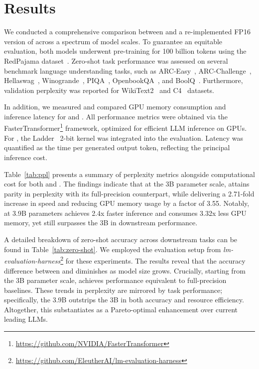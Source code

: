 \section{Results}

We conducted a comprehensive comparison between  and a re-implemented FP16 version of  across a spectrum of model scales. To guarantee an equitable evaluation, both models underwent pre-training for 100 billion tokens using the RedPajama dataset~\cite{redpajama}. Zero-shot task performance was assessed on several benchmark language understanding tasks, such as ARC-Easy~\cite{arc}, ARC-Challenge~\cite{arc}, Hellaswag~\cite{hellaswag}, Winogrande~\cite{winoGrande}, PIQA~\cite{piqa}, OpenbookQA~\cite{openbookqa}, and BoolQ~\cite{boolq}. Furthermore, validation perplexity was reported for WikiText2~\cite{wikitext2} and C4~\cite{c4} datasets.

In addition, we measured and compared GPU memory consumption and inference latency for  and . All performance metrics were obtained via the FasterTransformer\footnote{\url{https://github.com/NVIDIA/FasterTransformer}} framework, optimized for efficient LLM inference on GPUs. For , the Ladder~\cite{ladder} 2-bit kernel was integrated into the evaluation. Latency was quantified as the time per generated output token, reflecting the principal inference cost.

Table~\ref{tab:ppl} presents a summary of perplexity metrics alongside computational cost for both  and . The findings indicate that at the 3B parameter scale,  attains parity in perplexity with its full-precision  counterpart, while delivering a 2.71-fold increase in speed and reducing GPU memory usage by a factor of 3.55. Notably,  at 3.9B parameters achieves 2.4x faster inference and consumes 3.32x less GPU memory, yet still surpasses the 3B  in downstream performance.

A detailed breakdown of zero-shot accuracy across downstream tasks can be found in Table~\ref{tab:zero-shot}. We employed the evaluation setup from \emph{lm-evaluation-harness}\footnote{\url{https://github.com/EleutherAI/lm-evaluation-harness}} for these experiments. The results reveal that the accuracy difference between  and  diminishes as model size grows. Crucially, starting from the 3B parameter scale,  achieves performance equivalent to full-precision baselines. These trends in perplexity are mirrored by task performance; specifically, the 3.9B  outstrips the 3B  in both accuracy and resource efficiency. Altogether, this substantiates  as a Pareto-optimal enhancement over current leading LLMs.

